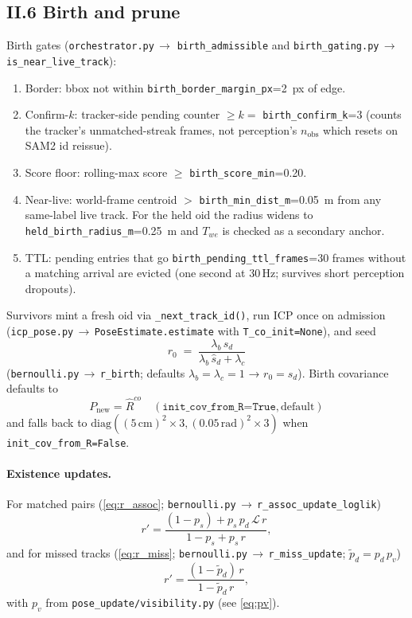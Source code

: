 \documentclass[11pt]{article}
\newcommand{\file}[1]{\texttt{#1}}
\begin{document}
\subsection*{II.6 Birth and prune}

Birth gates (\file{orchestrator.py}\,$\to$ \texttt{birth\_admissible}
and \file{birth\_gating.py}\,$\to$ \texttt{is\_near\_live\_track}):
\begin{enumerate}
\item Border: bbox not within \texttt{birth\_border\_margin\_px}=2~px of edge.
\item Confirm-$k$: tracker-side pending counter $\ge k = $
  \texttt{birth\_confirm\_k}=3 (counts the tracker's unmatched-streak
  frames, not perception's $n_{\text{obs}}$ which resets on SAM2 id reissue).
\item Score floor: rolling-max score $\ge $ \texttt{birth\_score\_min}=0.20.
\item Near-live: world-frame centroid $> $ \texttt{birth\_min\_dist\_m}=0.05~m
  from any same-label live track. For the held oid the radius widens to
  \texttt{held\_birth\_radius\_m}=0.25~m and $T_{we}$ is checked as a
  secondary anchor.
\item TTL: pending entries that go \texttt{birth\_pending\_ttl\_frames}=30
  frames without a matching arrival are evicted (one second at 30\,Hz;
  survives short perception dropouts).
\end{enumerate}
Survivors mint a fresh oid via \texttt{\_next\_track\_id()}, run ICP
once on admission (\file{icp\_pose.py}\,$\to$\,\texttt{PoseEstimate.estimate}
with \texttt{T\_co\_init=None}), and seed
\begin{equation}\label{eq:birth_r}
r_0 \;=\; \frac{\lambda_b\,\hat s_d}{\lambda_b\,\hat s_d + \lambda_c}
\end{equation}
(\file{bernoulli.py}\,$\to$\,\texttt{r\_birth}; defaults
$\lambda_b=\lambda_c=1$ → $r_0=\hat s_d$). Birth covariance defaults to
\begin{equation}\label{eq:birth_state}
P_{\text{new}} = \hat R^{co} \quad (\texttt{init\_cov\_from\_R=True}, \text{default})
\end{equation}
and falls back to $\mathrm{diag}((5\,\text{cm})^2{\times}3,(0.05\,\text{rad})^2{\times}3)$
when \texttt{init\_cov\_from\_R=False}.

\paragraph{Existence updates.}
For matched pairs (\eqref{eq:r_assoc};
\file{bernoulli.py}\,$\to$\,\texttt{r\_assoc\_update\_loglik})
\begin{equation}\label{eq:r_assoc}
r' = \frac{(1 - p_s) + p_s\,p_d\,\mathcal L\,r}{1 - p_s + p_s\,r},
\end{equation}
and for missed tracks (\eqref{eq:r_miss};
\file{bernoulli.py}\,$\to$\,\texttt{r\_miss\_update}; $\tilde p_d = p_d\,p_v$)
\begin{equation}\label{eq:r_miss}
r' = \frac{(1 - \tilde p_d)\,r}{1 - \tilde p_d\,r},
\end{equation}
with $p_v$ from \file{pose\_update/visibility.py} (see \eqref{eq:pv}).
\end{document}
